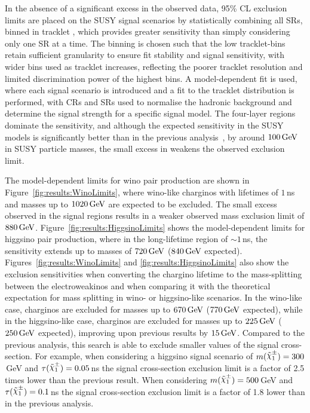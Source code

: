 In the absence of a significant excess in the observed data, 95\% CL exclusion limits are placed on the SUSY signal scenarios by statistically combining all SRs, binned in tracklet \pt, which provides greater sensitivity than simply considering only one SR at a time. The binning is chosen such that the low tracklet-\pt bins retain sufficient granularity to ensure fit stability and signal sensitivity, with wider bins used as tracklet \pt increases, reflecting the poorer tracklet \pt resolution and limited discrimination power of the highest bins. A model-dependent fit is used, where each signal scenario is introduced and a fit to the tracklet \pt distribution is performed, with CRs and SRs used to normalise the hadronic background and determine the signal strength for a specific signal model.
The four-layer regions dominate the sensitivity, and although the expected sensitivity in the SUSY models is significantly better than in the previous analysis~\cite{SUSY-2018-19}, by around $100\,\text{GeV}$ in SUSY particle masses, the small excess in \SRAh weakens the observed exclusion limit.

The model-dependent limits for wino pair production are shown in Figure~\ref{fig:results:WinoLimits}, where wino-like charginos with lifetimes of $1\,$ns and masses up to $1020\,\text{GeV}$ are expected to be excluded. The small excess observed in the signal regions results in a weaker observed mass exclusion limit of $880\,\text{GeV}$.
Figure~\ref{fig:results:HiggsinoLimits} shows the model-dependent limits for higgsino pair production, where in the long-lifetime region of ${\sim}1$\,ns, the sensitivity extends up to masses of $720\,\text{GeV}$ ($840\,\text{GeV}$ expected). 
Figures~\ref{fig:results:WinoLimits} and \ref{fig:results:HiggsinoLimits} also show the exclusion sensitivities when converting the chargino lifetime to the mass-splitting between the electroweakinos and when comparing it with the theoretical expectation for mass splitting in wino- or higgsino-like scenarios. In the wino-like case, charginos are excluded for masses up to $670\,\text{GeV}$ ($770\,\text{GeV}$ expected), while in the higgsino-like case, charginos are excluded for masses up to $225\,\text{GeV}$ ($250\,\text{GeV}$ expected), improving upon previous results by $15\,\text{GeV}$. Compared to the previous analysis, this search is able to exclude smaller values of the signal cross-section. For example, when considering a higgsino signal scenario of $m(\chinoonepm) = 300$\,GeV and $\tau(\chinoonepm) = 0.05$\,ns the signal cross-section exclusion limit is a factor of 2.5 times lower than the previous result. When considering $m(\chinoonepm) = 500$\,GeV and $\tau(\chinoonepm) = 0.1$\,ns the signal cross-section exclusion limit is a factor of 1.8 lower than in the previous analysis. 

